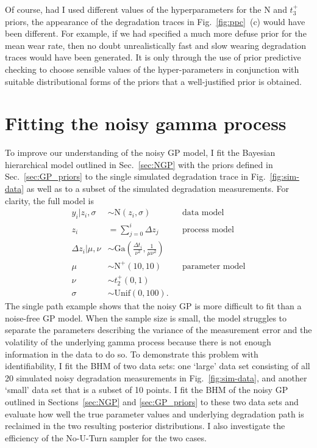Of course, had I used different values of the hyperparameters for the $\mbox{N}$ and $t_3^{+}$ priors, the appearance of the degradation traces in Fig.~\ref{fig:ppc}~(c) would have been different. For example, if we had specified a much more defuse prior for the mean wear rate, then no doubt unrealistically fast and slow wearing degradation traces would have been generated. It is only through the use of prior predictive checking to choose sensible values of the hyper-parameters in conjunction with suitable distributional forms of the priors that a well-justified prior is obtained.

\section{Fitting the noisy gamma process} \label{sec:NGP-fitting}

To improve our understanding of the noisy GP model, I fit the Bayesian hierarchical model outlined in Sec.~\ref{sec:NGP} with the priors defined in Sec.~\ref{sec:GP_priors} to the single simulated degradation trace in Fig.~\ref{fig:sim-data} as well as to a subset of the simulated degradation measurements. For clarity, the full model is
\begin{align*}
  y_i|z_i, \sigma & \sim \mbox{N}(z_i, \sigma)  && \mbox{data model} \\
  z_i & = \sum_{j=0}^i \Delta z_j && \mbox{process model} \\ 
  \Delta z_i|\mu, \nu & \sim \mbox{Ga} \left( \frac{\Delta t_i}{\nu^2}, \frac{1}{\mu \nu^2} \right) \\
  \mu & \sim \mbox{N}^{+}(10, 10) && \mbox{parameter model} \\
  \nu & \sim t_2^{+}(0, 1) \\
  \sigma & \sim \mbox{Unif}(0, 100).
\end{align*}
The single path example shows that the noisy GP is more difficult to fit than a noise-free GP model. When the sample size is small, the model struggles to separate the parameters describing the variance of the measurement error and the volatility of the underlying gamma process because there is not enough information in the data to do so. To demonstrate this problem with identifiability, I fit the BHM of two data sets: one `large' data set consisting of all 20 simulated noisy degradation measurements in Fig.~\ref{fig:sim-data}, and another `small' data set that is a subset of 10 points. I fit the BHM of the noisy GP outlined in Sections~\ref{sec:NGP} and \ref{sec:GP_priors} to these two data sets and evaluate how well the true parameter values and underlying degradation path is reclaimed in the two resulting posterior distributions. I also investigate the efficiency of the No-U-Turn sampler for the two cases.

